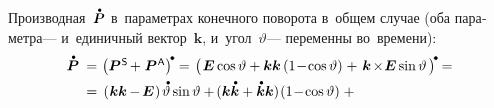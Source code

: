 \begin{otherlanguage}{russian}
Производная~${\mathdotabove{\bm{P}}}$ в~параметрах конечного поворота в~общем случае (оба параметра\:--- и~единичный вектор~$\bm{k}$, и~угол~$\vartheta$\:--- переменны во~времени):
\vspace{.32em}%
\[\begin{array}{r@{\hspace{.33em}}c@{\hspace{.25em}}l}
\mathdotabove{\bm{P}} \hspace{.2em} & = & \hspace{.1em} \left(\bm{P}^{\mathsf{\hspace{.12ex}S}} \hspace{-0.2ex} +^{\mathstrut} \bm{P}^{\mathsf{\hspace{.12ex}A}}\right)^{\hspace{-0.2ex}\tikz[baseline=-0.5ex]\draw[black, fill=black] (0,0) circle (.266ex);} =
\hspace{.1em} \left(\hspace{.2ex} \tikzmark{StartBracePs} {\bm{E} \operatorname{cos} \vartheta + \bm{k} \bm{k} \left({1 \!-\! \operatorname{cos} \vartheta}\right)} \hspace{-0.2ex} \tikzmark{EndBracePs} \hspace{.32ex} +^{\mathstrut} \hspace{.2ex}
\tikzmark{StartBracePa} {\bm{k} \hspace{-0.24ex}\times\hspace{-0.4ex} \bm{E} \operatorname{sin} \vartheta \hspace{.2ex}} \tikzmark{EndBracePa} {} \hspace{.16ex}\right)^{\hspace{-0.2ex}\tikz[baseline=-0.5ex]\draw[black, fill=black] (0,0) circle (.266ex);} \hspace{-0.05em} = \\[0.4em]
%
& = & \hspace{.2em} \tikzmark{StartBraceDotPs} {\left( \hspace{.1ex} \bm{k} \bm{k} \hspace{-0.1ex} - \hspace{-0.2ex} \bm{E} \hspace{.1ex} \right) \hspace{-0.1ex} \mathdotabove{\vartheta} \operatorname{sin} \vartheta + \hspace{-0.2ex} ( \bm{k} \mathdotabove{\bm{k}} + \mathdotabove{\bm{k}} \bm{k} ) \hspace{-0.2ex} \left({1 \!-\! \operatorname{cos} \vartheta}\right)} \tikzmark{EndBraceDotPs} \hspace{.64ex} + \\[0.64em]

\end{array}\]
\end{otherlanguage}
